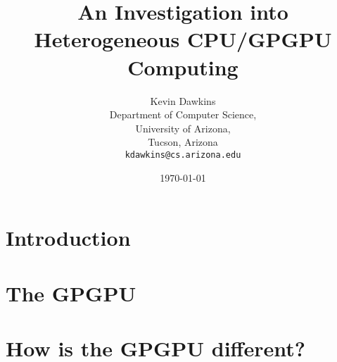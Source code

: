 \documentclass[12pt,notitlepage]{report}
\begin{document}
\title{An Investigation into Heterogeneous CPU/GPGPU Computing}
\author{Kevin Dawkins\\
  Department of Computer Science,\\
  University of Arizona,\\
  Tucson, Arizona\\
  \texttt{kdawkins@cs.arizona.edu}}
\date{\today}
\maketitle



\tableofcontents

\chapter*{Introduction}


\chapter*{The GPGPU}


\chapter*{How is the GPGPU different?}


\nocite{nvidia, mapreduce, tlpcache, cpuassist}



\end{document}
